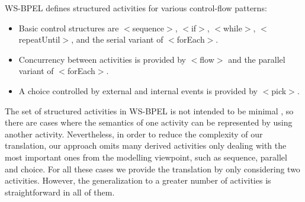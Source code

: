 WS-BPEL defines structured activities for various control-flow patterns:
\begin{itemize} 
\item Basic control structures are $<$sequence$>$, $<$if$>$, $<$while$>$, 
$<$repeatUntil$>$, and the serial variant of $<$forEach$>$. 
\item Concurrency between activities is provided by $<$flow$>$ and the 
parallel variant of $<$forEach$>$.  
\item A choice controlled by external and internal events is provided by $<$pick$>$.  
\end{itemize}
The set of structured activities in WS-BPEL is not intended to be minimal \cite{Andrews2003WSBPEL}, so there are cases where 
the semantics of one activity can be represented by using another activity. Nevertheless, in order to reduce the complexity
of our translation, our approach omits many derived activities only dealing with the most important ones from the modelling viewpoint,
such as sequence, parallel and choice. For all these cases we provide the translation
by only considering two activities. However, the generalization
to a greater number of activities is straightforward in all
of them. 
